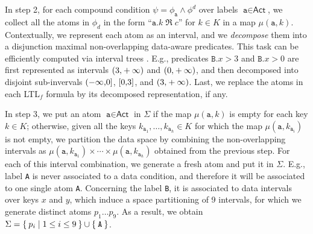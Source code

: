 In step 2, for each compound condition $\psi=\phi_{\texttt{a}}\wedge \phi^d$ over labels $\texttt{a}\in\textsf{Act}$, we collect all the atoms in $\phi_d$ in the form ``$\texttt{a}.k\;\Re\; c$'' for $k\in K$ in a map $\mu(\texttt{a},k)$. Contextually, we represent each atom as an interval, and we \textit{decompose} them
%
%
%
%
%
%
%
into a disjunction maximal non-overlapping data-aware predicates. This task can be efficiently computed via interval trees \cite{inttree}. E.g., predicates $\texttt{B}.x>3$ and $\texttt{B}.x>0$ are first represented as intervals $\interval({3,+\infty})$ and $\interval({0,+\infty})$, and then decomposed into disjoint sub-invervals $\interval({-\infty,0}]$, $\interval[{0,3}]$, and $\interval({3,+\infty})$. Last, we replace the atoms in each LTL$_f$ formula by its decomposed representation, if any. 


In step 3, we put an atom $\texttt{a}\in\textsf{Act}$ in $\Sigma$ if the map $\mu(\texttt{a},k)$ is empty for each key $k\in K$; otherwise, given all the keys $k_{\texttt{a}_1},\dots,k_{\texttt{a}_h}\in K$ for which the map $\mu(\texttt{a},k_{\texttt{a}_i})$ is not empty, we partition the data space by combining the non-overlapping intervals as $\mu(\texttt{a},k_{\texttt{a}_1})\times\cdots\times\mu(\texttt{a},k_{\texttt{a}_h})$ obtained from the previous step. For each of this interval combination, we generate a fresh atom and put it in $\Sigma$. E.g., label \texttt{A} is never associated to a data condition, and therefore it will be associated to one single atom \texttt{A}. Concerning the label \texttt{B}, it is associated to data intervals over keys $x$ and $y$, which induce a space partitioning of 9 intervals, for which we generate distinct atoms $p_1\dots p_9$. As a result, we obtain $\Sigma=\Set{p_i|1\leq i\leq 9}\cup\Set{\texttt{A}}$.


